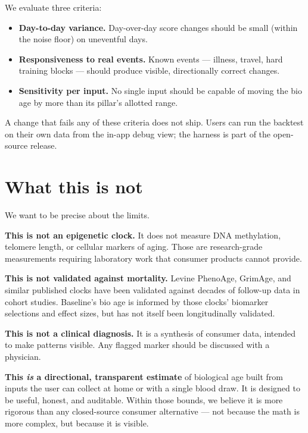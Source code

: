 \documentclass[11pt, a4paper]{article}
\begin{document}
We evaluate three criteria:

\begin{itemize}
  \item \textbf{Day-to-day variance.} Day-over-day score changes should be small (within the noise floor) on uneventful days.
  \item \textbf{Responsiveness to real events.} Known events --- illness, travel, hard training blocks --- should produce visible, directionally correct changes.
  \item \textbf{Sensitivity per input.} No single input should be capable of moving the bio age by more than its pillar's allotted range.
\end{itemize}

A change that fails any of these criteria does not ship. Users can run the backtest on their own data from the in-app debug view; the harness is part of the open-source release.

\section{What this is not}

We want to be precise about the limits.

\textbf{This is not an epigenetic clock.} It does not measure DNA methylation, telomere length, or cellular markers of aging. Those are research-grade measurements requiring laboratory work that consumer products cannot provide.

\textbf{This is not validated against mortality.} Levine PhenoAge, GrimAge, and similar published clocks have been validated against decades of follow-up data in cohort studies. Baseline's bio age is informed by those clocks' biomarker selections and effect sizes, but has not itself been longitudinally validated.

\textbf{This is not a clinical diagnosis.} It is a synthesis of consumer data, intended to make patterns visible. Any flagged marker should be discussed with a physician.

\textbf{This \emph{is} a directional, transparent estimate} of biological age built from inputs the user can collect at home or with a single blood draw. It is designed to be useful, honest, and auditable. Within those bounds, we believe it is more rigorous than any closed-source consumer alternative --- not because the math is more complex, but because it is visible.
\end{document}
